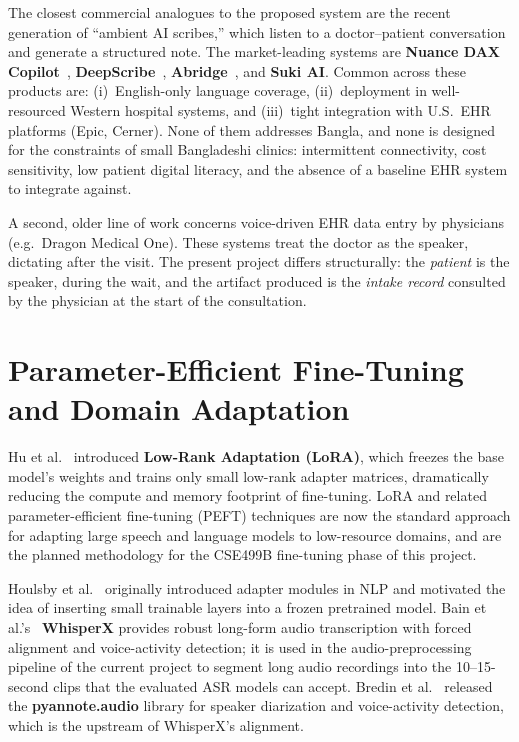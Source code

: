 \documentclass[12pt,a4paper]{article}
\begin{document}
The closest commercial analogues to the proposed system are the
recent generation of ``ambient AI scribes,'' which listen to a
doctor--patient conversation and generate a structured note. The
market-leading systems are \textbf{Nuance DAX
Copilot}~\cite{rw:nuance}, \textbf{DeepScribe}~\cite{rw:deepscribe},
\textbf{Abridge}~\cite{rw:abridge}, and \textbf{Suki AI}. Common
across these products are: (i)~English-only language coverage,
(ii)~deployment in well-resourced Western hospital systems, and
(iii)~tight integration with U.S.\ EHR platforms (Epic, Cerner).
None of them addresses Bangla, and none is designed for the
constraints of small Bangladeshi clinics: intermittent connectivity,
cost sensitivity, low patient digital literacy, and the absence of
a baseline EHR system to integrate against.

A second, older line of work concerns voice-driven EHR data entry
by physicians (e.g.\ Dragon Medical One). These systems treat the
doctor as the speaker, dictating after the visit. The present
project differs structurally: the \emph{patient} is the speaker,
during the wait, and the artifact produced is the \emph{intake
record} consulted by the physician at the start of the consultation.

\section{Parameter-Efficient Fine-Tuning and Domain Adaptation}

Hu et al.~\cite{rw:lora} introduced \textbf{Low-Rank
Adaptation (LoRA)}, which freezes the base model's weights and
trains only small low-rank adapter matrices, dramatically reducing
the compute and memory footprint of fine-tuning. LoRA and related
parameter-efficient fine-tuning (PEFT) techniques are now the
standard approach for adapting large speech and language models to
low-resource domains, and are the planned methodology for the
CSE499B fine-tuning phase of this project.

Houlsby et al.~\cite{rw:adapters} originally introduced adapter
modules in NLP and motivated the idea of inserting small trainable
layers into a frozen pretrained model. Bain et
al.'s~\cite{rw:whisperx} \textbf{WhisperX} provides robust
long-form audio transcription with forced alignment and
voice-activity detection; it is used in the audio-preprocessing
pipeline of the current project to segment long audio recordings
into the 10--15-second clips that the evaluated ASR models can
accept. Bredin et al.~\cite{rw:pyannote} released the
\textbf{pyannote.audio} library for speaker diarization and
voice-activity detection, which is the upstream of WhisperX's
alignment.
\end{document}
